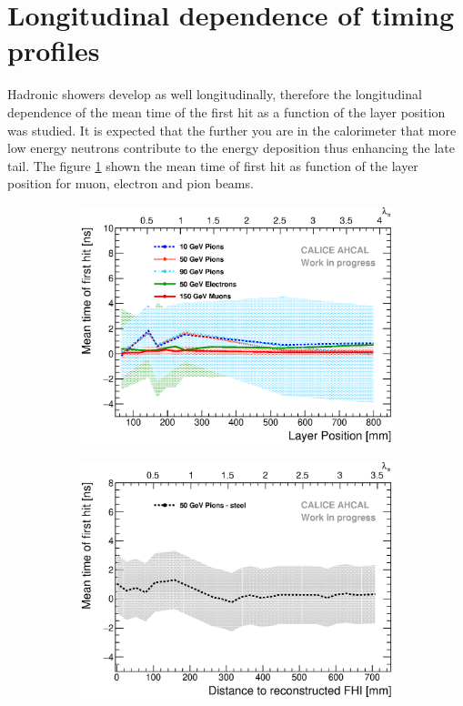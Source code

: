 \section{Longitudinal dependence of timing profiles}

Hadronic showers develop as well longitudinally, therefore the longitudinal dependence of the mean time of the first hit as a function of the layer position was studied. It is expected that the further you are in the calorimeter that more low energy neutrons contribute to the energy deposition thus enhancing the late tail. The figure \ref{fig:Depth_Comparison} shown the mean time of first hit as function of the layer position for muon, electron and pion beams.

\begin{figure}[htbp!]
	\begin{subfigure}[t]{0.49\textwidth}
		\centering
		\includegraphics[width=1\textwidth]{../Thesis_Plots/Timing/Pions/Plots/Timing_Depth_Comparison_ShortAsymRange.eps}
		\caption{} \label{fig:Depth_Comparison}
	\end{subfigure}
	\hfill
	\begin{subfigure}[t]{0.49\textwidth}
		\centering
		\includegraphics[width=1\textwidth]{../Thesis_Plots/Timing/Pions/Plots/Timing_Depth_Comparison_ShortAsymRange_ShowerStart.eps}

\end{subfigure}
\end{figure}

